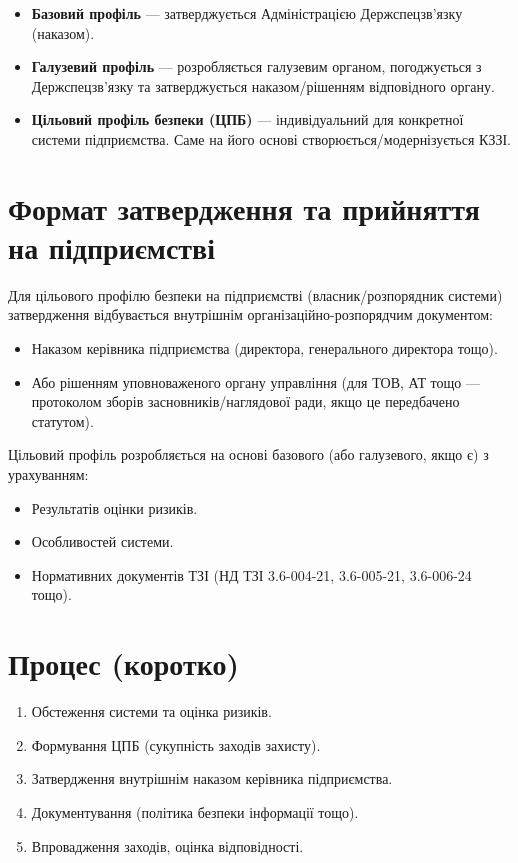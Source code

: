 \documentclass{article}
\begin{document}
\begin{itemize}
    \item \textbf{Базовий профіль} — затверджується Адміністрацією Держспецзв’язку (наказом).
    \item \textbf{Галузевий профіль} — розробляється галузевим органом, погоджується з Держспецзв’язку та затверджується наказом/рішенням відповідного органу.
    \item \textbf{Цільовий профіль безпеки (ЦПБ)} — індивідуальний для конкретної системи підприємства. Саме на його основі створюється/модернізується КЗЗІ.
\end{itemize}

\section{Формат затвердження та прийняття на підприємстві}

Для цільового профілю безпеки на підприємстві (власник/розпорядник системи) затвердження відбувається внутрішнім організаційно-розпорядчим документом:

\begin{itemize}
    \item Наказом керівника підприємства (директора, генерального директора тощо).
    \item Або рішенням уповноваженого органу управління (для ТОВ, АТ тощо — протоколом зборів засновників/наглядової ради, якщо це передбачено статутом).
\end{itemize}

Цільовий профіль розробляється на основі базового (або галузевого, якщо є) з урахуванням:

\begin{itemize}
    \item Результатів оцінки ризиків.
    \item Особливостей системи.
    \item Нормативних документів ТЗІ (НД ТЗІ 3.6-004-21, 3.6-005-21, 3.6-006-24 тощо).
\end{itemize}

\section{Процес (коротко)}
\begin{enumerate}
    \item Обстеження системи та оцінка ризиків.
    \item Формування ЦПБ (сукупність заходів захисту).
    \item Затвердження внутрішнім наказом керівника підприємства.
    \item Документування (політика безпеки інформації тощо).
    \item Впровадження заходів, оцінка відповідності.
\end{enumerate}
\end{document}
